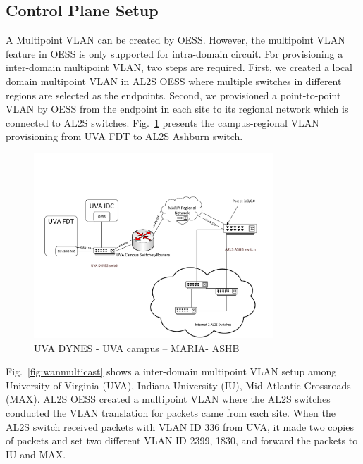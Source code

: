 \subsection{Control Plane Setup}
\label{sec:controlplanefinal}
A Multipoint VLAN can be created by OESS. However, the multipoint VLAN feature in OESS is only supported for intra-domain circuit. For provisioning a inter-domain multipoint VLAN, two steps are required. First, we created a local domain multipoint VLAN in AL2S OESS where multiple switches in different regions are selected as the endpoints. Second, we provisioned a point-to-point VLAN by OESS from the endpoint in each site to its regional network which is connected to AL2S switches. Fig.~\ref{fig:campus-regional} presents the campus-regional VLAN provisioning from UVA FDT to AL2S Ashburn switch.
\begin{figure}[htb!]
\centering
\includegraphics[width=0.8\textwidth]{figures/UVA-ASHB.pdf}
\caption{UVA DYNES - UVA campus – MARIA- ASHB}
\label{fig:campus-regional}
\end{figure}
Fig.~\ref{fig:wanmulticast} shows a inter-domain multipoint VLAN setup among University of Virginia (UVA), Indiana University (IU), Mid-Atlantic Crossroads (MAX). AL2S OESS created a multipoint VLAN where the AL2S switches conducted the VLAN translation for packets came from each site. When the AL2S switch received packets with VLAN ID 336 from UVA, it made two copies of packets and set two different VLAN ID 2399, 1830, and forward the packets to IU and MAX.




